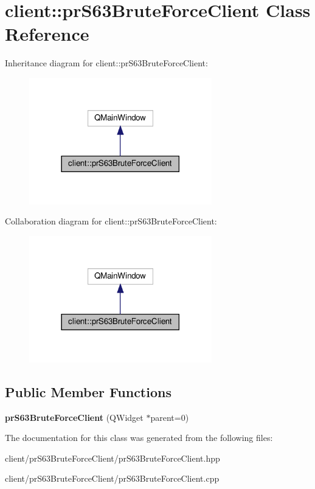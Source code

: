 \hypertarget{classclient_1_1pr_s63_brute_force_client}{}\section{client\+:\+:pr\+S63\+Brute\+Force\+Client Class Reference}
\label{classclient_1_1pr_s63_brute_force_client}


Inheritance diagram for client\+:\+:pr\+S63\+Brute\+Force\+Client\+:\nopagebreak
\begin{figure}[H]
\begin{center}
\leavevmode
\includegraphics[width=225pt]{classclient_1_1pr_s63_brute_force_client__inherit__graph}
\end{center}
\end{figure}


Collaboration diagram for client\+:\+:pr\+S63\+Brute\+Force\+Client\+:\nopagebreak
\begin{figure}[H]
\begin{center}
\leavevmode
\includegraphics[width=225pt]{classclient_1_1pr_s63_brute_force_client__coll__graph}
\end{center}
\end{figure}
\subsection*{Public Member Functions}
\begin{DoxyCompactItemize}
\item 
\mbox{\label{classclient_1_1pr_s63_brute_force_client_afa4597562e1bc7baa938d6fb29989d25}} 
{\bfseries pr\+S63\+Brute\+Force\+Client} (Q\+Widget $\ast$parent=0)
\end{DoxyCompactItemize}


The documentation for this class was generated from the following files\+:\begin{DoxyCompactItemize}
\item 
client/pr\+S63\+Brute\+Force\+Client/pr\+S63\+Brute\+Force\+Client.\+hpp\item 
client/pr\+S63\+Brute\+Force\+Client/pr\+S63\+Brute\+Force\+Client.\+cpp\end{DoxyCompactItemize}
